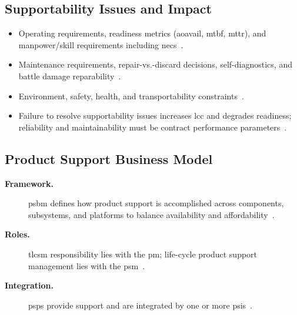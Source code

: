 \documentclass[../main.tex]{subfiles}
\begin{document}
\subsection{Supportability Issues and Impact}
\begin{itemize}
  \item Operating requirements, readiness metrics (\ac{aoavail}, \ac{mtbf}, \ac{mttr}), and manpower/skill requirements including \acp{nec}~\autocite{edo-3-5-4-acquisition-logistics-2025}.
  \item Maintenance requirements, repair-vs.-discard decisions, self-diagnostics, and battle damage reparability~\autocite{edo-3-5-4-acquisition-logistics-2025}.
  \item Environment, safety, health, and transportability constraints~\autocite{edo-3-5-4-acquisition-logistics-2025}.
  \item Failure to resolve supportability issues increases \ac{lcc} and degrades readiness; reliability and maintainability must be contract performance parameters~\autocite{edo-3-5-4-acquisition-logistics-2025}.
\end{itemize}

\subsection{Product Support Business Model}
\begin{description}
  \item[\textbf{Framework.}] \ac{psbm} defines how product support is accomplished across components, subsystems, and platforms to balance availability and affordability~\autocite{edo-3-5-4-acquisition-logistics-2025}.
  \item[\textbf{Roles.}] \ac{tlcsm} responsibility lies with the \ac{pm}; life-cycle product support management lies with the \ac{psm}~\autocite{edo-3-5-4-acquisition-logistics-2025}.
  \item[\textbf{Integration.}] \acp{psp} provide support and are integrated by one or more \acp{psi}~\autocite{edo-3-5-4-acquisition-logistics-2025}.
\end{description}
\end{document}
